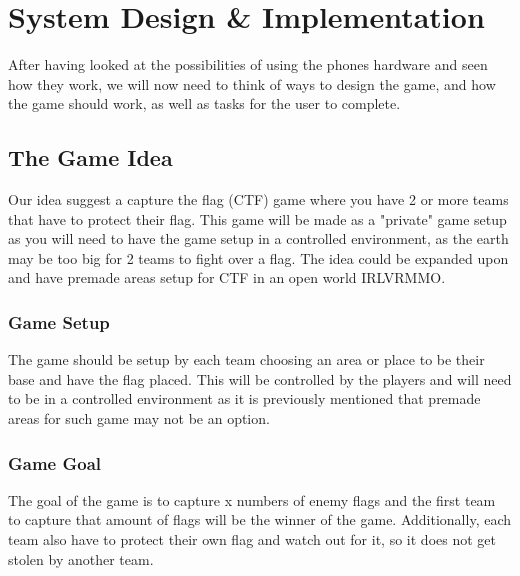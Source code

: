 \chapter{System Design \& Implementation}

After having looked at the possibilities of using the phones hardware and seen how they work, we will now need to think of ways to design the game, and how the game should work, as well as tasks for the user to complete.

\section{The Game Idea}

Our idea suggest a capture the flag (CTF) game where you have 2 or more teams that have to protect their flag. This game will be made as a "private" game setup as you will need to have the game setup in a controlled environment, as the earth may be too big for 2 teams to fight over a flag. The idea could be expanded upon and have premade areas setup for CTF in an open world IRLVRMMO.

\subsection{Game Setup}

The game should be setup by each team choosing an area or place to be their base and have the flag placed. This will be controlled by the players and will need to be in a controlled environment as it is previously mentioned that premade areas for such game may not be an option.

\subsection{Game Goal}

The goal of the game is to capture x numbers of enemy flags and the first team to capture that amount of flags will be the winner of the game. Additionally, each team also have to protect their own flag and watch out for it, so it does not get stolen by another team.



